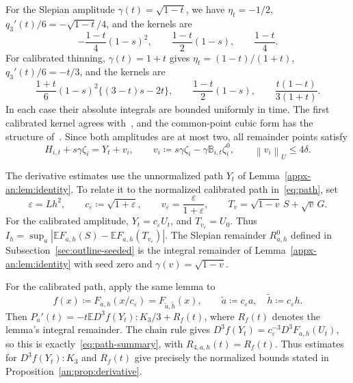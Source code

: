 \documentclass[11pt,letterpaper]{article}
\theoremstyle{remark}
\newcommand{\E}{\mathbb E}
\newcommand{\norm}[1]{\left\lVert#1\right\rVert}
\begin{document}
For the Slepian amplitude \(\gamma(t)=\sqrt{1-t}\), we have
\(\eta_t=-1/2\), \(q_3'(t)/6=-\sqrt{1-t}/4\), and the kernels are
\[
 -\frac{1-t}{4}(1-s)^2,\qquad
 \frac{1-t}{2}(1-s),\qquad\frac{1-t}{4}.
\]
For calibrated thinning, \(\gamma(t)=1+t\) gives
\(\eta_t=(1-t)/(1+t)\), \(q_3'(t)/6=-t/3\), and the kernels are
\[
 \frac{1+t}{6}(1-s)^2\{(3-t)s-2t\},\qquad
 \frac{1-t}{2}(1-s),\qquad\frac{t(1-t)}{3(1+t)}.
\]
In each case their absolute integrals are bounded uniformly in time.
The first calibrated kernel agrees with~\cite[Lemma~4.1]{AL}, and
the common-point cubic form has the structure
of~\cite[Lemma~22]{GaoZhang}. Since both amplitudes are at most two,
all remainder points satisfy
\begin{equation}
 H_{i,t}+s\gamma\zeta_i=Y_t+v_i,\qquad
 v_i\coloneqq s\gamma\zeta_i-\gamma\mathbb B_{i,t}\zeta_i^0,
 \qquad \norm{v_i}_U\le4\delta.
 \label{appx-an:translates}
\end{equation}

The derivative estimates use the unnormalized path \(Y_t\) of
Lemma~\ref{appx-an:lem:identity}. To relate it to the normalized
calibrated path in~\eqref{eq:path}, set
\begin{equation}
 \varepsilon=Lh^2,\qquad
 c_\varepsilon\coloneqq\sqrt{1+\varepsilon},\qquad
 v_\varepsilon=\frac{\varepsilon}{1+\varepsilon},
 \qquad T_v=\sqrt{1-v}\,S+\sqrt v\,G.
 \label{eq:seed-initialization}
\end{equation}
For the calibrated amplitude, \(Y_t=c_\varepsilon U_t\), and
\(T_{v_\varepsilon}=U_0\). Thus
\(I_h=\sup_a|\E F_{a,h}(S)-\E F_{a,h}(T_{v_\varepsilon})|\).
The Slepian remainder \(R^0_{a,h}\) defined in
Subsection~\ref{sec:outline-seeded} is the integral remainder of
Lemma~\ref{appx-an:lem:identity} with seed zero and
\(\gamma(v)=\sqrt{1-v}\).

For the calibrated path, apply the same lemma to
\begin{equation}
 f(x)\coloneqq F_{a,h}(x/c_\varepsilon)
       =F_{\widetilde a,\widetilde h}(x),\qquad
 \widetilde a\coloneqq c_\varepsilon a,\quad
 \widetilde h\coloneqq c_\varepsilon h.
 \label{eq:seeded-test}
\end{equation}
Then \(P_a'(t)=-t\E D^3f(Y_t):K_3/3+R_f(t)\), where
\(R_f(t)\) denotes the lemma's integral remainder. The chain rule
gives \(D^3f(Y_t)=c_\varepsilon^{-3}D^3F_{a,h}(U_t)\), so this is
exactly~\eqref{eq:path-summary}, with \(R_{4,a,h}(t)=R_f(t)\).
Thus estimates for \(D^3f(Y_t):K_3\) and \(R_f(t)\) give precisely
the normalized bounds stated in Proposition~\ref{an:prop:derivative}.
\end{document}
